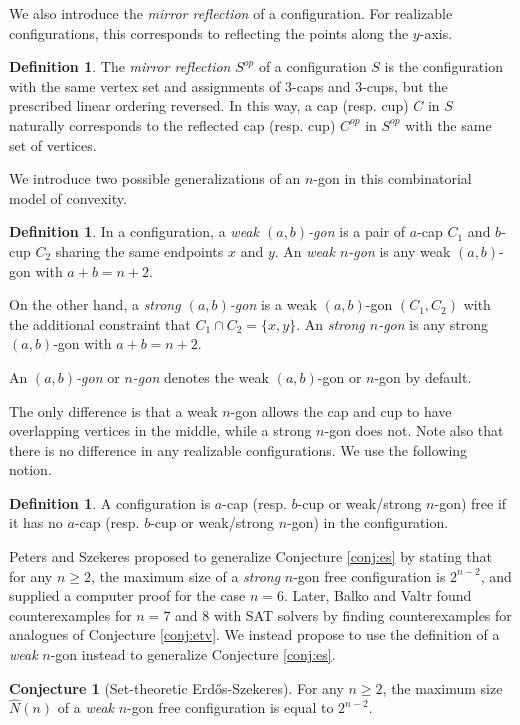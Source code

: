 \documentclass{amsart}
\theoremstyle{definition}
\newtheorem{definition}[thm]{Definition}
\newtheorem{conjecture}{Conjecture}
\numberwithin{thm}{section}
\begin{document}
We also introduce the \emph{mirror reflection} of a configuration.
For realizable configurations, this corresponds to reflecting the points along the $y$-axis.
\begin{definition}
The \emph{mirror reflection} $S^{op}$ of a configuration $S$ 
is the configuration with the same vertex set and assignments of 3-caps and 3-cups, but the prescribed linear ordering reversed.
In this way, a cap (resp. cup) $C$ in $S$ naturally corresponds to the reflected cap (resp. cup) $C^{op}$ in $S^{op}$ with the same set of vertices.
\end{definition}

We introduce two possible generalizations of an $n$-gon in this combinatorial model of convexity.
\begin{definition}
In a configuration, a \emph{weak $(a, b)$-gon} is a pair of $a$-cap $C_1$ and $b$-cup $C_2$ sharing the same endpoints $x$ and $y$.
An \emph{weak $n$-gon} is any weak $(a, b)$-gon with $a + b = n + 2$.

On the other hand, a \emph{strong $(a, b)$-gon} is a weak $(a, b)$-gon $(C_1, C_2)$ with the additional constraint that $C_1 \cap C_2 = \{x, y\}$.
An \emph{strong $n$-gon} is any strong $(a, b)$-gon with $a + b = n + 2$.

An \emph{$(a, b)$-gon} or \emph{$n$-gon} denotes the weak $(a, b)$-gon or $n$-gon by default.
\end{definition}
The only difference is that a weak $n$-gon allows the cap and cup to have overlapping vertices in the middle, while a strong $n$-gon does not. 
Note also that there is no difference in any realizable configurations. 
We use the following notion.
\begin{definition}
A configuration is $a$-cap (resp. $b$-cup or weak/strong $n$-gon) free if it has no $a$-cap (resp. $b$-cup or weak/strong $n$-gon) in the configuration.	
\end{definition}
Peters and Szekeres \cite{szekeres2006computer} proposed to generalize Conjecture \ref{conj:es} by stating that for any $n \geq 2$, the maximum size of a \emph{strong} $n$-gon free configuration is $2^{n-2}$, and supplied a computer proof for the case $n = 6$.
Later, Balko and Valtr \cite{balko2017sat} found counterexamples for $n = 7$ and $8$ with SAT solvers by finding counterexamples for analogues of Conjecture \ref{conj:etv}.
We instead propose to use the definition of a \emph{weak} $n$-gon instead to generalize Conjecture \ref{conj:es}.
\begin{conjecture}[Set-theoretic Erd\H{o}s-Szekeres]
\label{conj:es-set}
For any $n \geq 2$, 
the maximum size $\widehat{N}(n)$ of a \emph{weak} $n$-gon free configuration is equal to 
$2^{n-2}$.
\end{conjecture}
\end{document}
